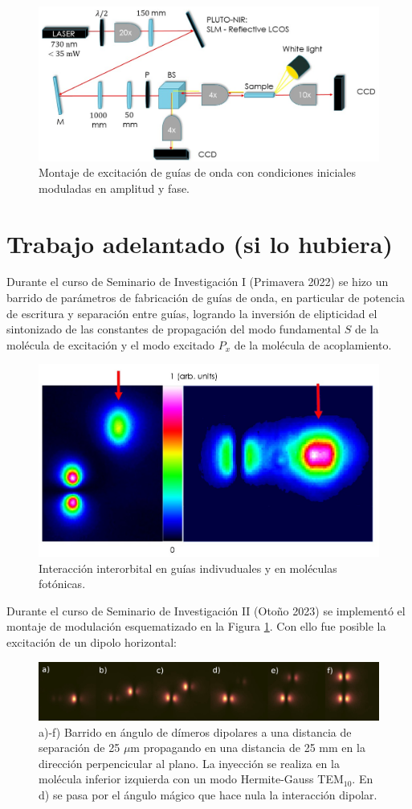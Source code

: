 \documentclass{article}
\begin{document}
\begin{figure}[H]
	\centering
	\includegraphics[width=0.9\linewidth]{./media/SLMsetup.png}
	\caption{Montaje de excitación de guías de onda con condiciones iniciales moduladas en amplitud y fase.\label{fig:SLM}}
\end{figure}

\section{Trabajo adelantado (si lo hubiera)}

Durante el curso de Seminario de Investigación I (Primavera 2022) se hizo un barrido de parámetros de fabricación de guías de onda, en particular de potencia de escritura y separación entre guías, logrando la inversión de elipticidad el sintonizado de las constantes de propagación del modo fundamental $S$ de la molécula de excitación y el modo excitado $P_x$ de la molécula de acoplamiento.


\begin{figure}[H]
	\centering
	\includegraphics[width=0.5\linewidth]{./media/SPinteraction.jpg}
	\caption{Interacción interorbital en guías indivuduales y en moléculas fotónicas.}
\end{figure}

Durante el curso de Seminario de Investigación II (Otoño 2023) se implementó el montaje de modulación esquematizado en la Figura \ref{fig:SLM}. Con ello fue posible la excitación de un dipolo horizontal:

\begin{figure}[H]
	\centering
	\includegraphics[width=1.0\linewidth]{./media/dipoles.jpg}
	\caption{a)-f) Barrido en ángulo de dímeros dipolares a una distancia de separación de 25 $\mu$m propagando en una distancia de 25 mm en la dirección perpencicular al plano. La inyección se realiza en la molécula inferior izquierda con un modo Hermite-Gauss TEM$_{10}$. En d) se pasa por el ángulo mágico que hace nula la interacción dipolar.}
\end{figure}
\end{document}
